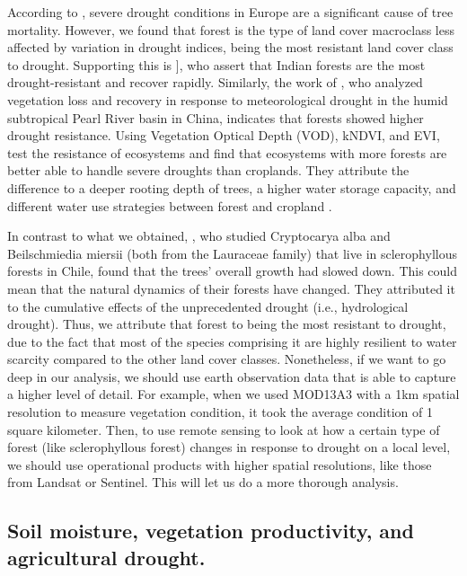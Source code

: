 \documentclass[
  authoryear,
  preprint,
  3p,
  onecolumn]{elsarticle}
\begin{document}
According to \citet{Senf2020}, severe drought conditions in Europe are a
significant cause of tree mortality. However, we found that forest is
the type of land cover macroclass less affected by variation in drought
indices, being the most resistant land cover class to drought.
Supporting this is \citet{Fathi-Taperasht2022}{]}, who assert that
Indian forests are the most drought-resistant and recover rapidly.
Similarly, the work of \citet{Wu2024}, who analyzed vegetation loss and
recovery in response to meteorological drought in the humid subtropical
Pearl River basin in China, indicates that forests showed higher drought
resistance. Using Vegetation Optical Depth (VOD), kNDVI, and EVI,
\citet{Xiao2023} test the resistance of ecosystems and find that
ecosystems with more forests are better able to handle severe droughts
than croplands. They attribute the difference to a deeper rooting depth
of trees, a higher water storage capacity, and different water use
strategies between forest and cropland \citep{Xiao2023}.

In contrast to what we obtained, \citet{Venegas2022}, who studied
Cryptocarya alba and Beilschmiedia miersii (both from the Lauraceae
family) that live in sclerophyllous forests in Chile, found that the
trees' overall growth had slowed down. This could mean that the natural
dynamics of their forests have changed. They attributed it to the
cumulative effects of the unprecedented drought (i.e., hydrological
drought). Thus, we attribute that forest to being the most resistant to
drought, due to the fact that most of the species comprising it are
highly resilient to water scarcity compared to the other land cover
classes. Nonetheless, if we want to go deep in our analysis, we should
use earth observation data that is able to capture a higher level of
detail. For example, when we used MOD13A3 with a 1km spatial resolution
to measure vegetation condition, it took the average condition of 1
square kilometer. Then, to use remote sensing to look at how a certain
type of forest (like sclerophyllous forest) changes in response to
drought on a local level, we should use operational products with higher
spatial resolutions, like those from Landsat or Sentinel. This will let
us do a more thorough analysis.

\hypertarget{soil-moisture-vegetation-productivity-and-agricultural-drought.}{%
\subsection{Soil moisture, vegetation productivity, and agricultural
drought.}\label{soil-moisture-vegetation-productivity-and-agricultural-drought.}}
\end{document}
